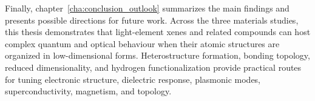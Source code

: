 Finally, chapter~\ref{cha:conclusion_outlook} summarizes the main findings and presents possible directions for future work.
Across the three materials studies, this thesis demonstrates that light-element xenes and related compounds can host complex quantum and optical behaviour when their atomic structures are organized in low-dimensional forms.
Heterostructure formation, bonding topology, reduced dimensionality, and hydrogen functionalization provide practical routes for tuning electronic structure, dielectric response, plasmonic modes, superconductivity, magnetism, and topology.
